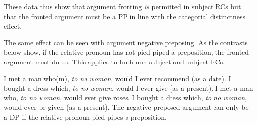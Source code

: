 \documentclass[output=paper]{langsci/langscibook}
\begin{document}
\ea\label{ex:2.47}
    \z
\ex\label{ex:2.48}
    \z
\z
These data thus show that argument fronting \emph{is} permitted in subject RCs
but that the fronted argument must be a PP in line with the categorial
distinctness effect.

The same effect can be seen with argument negative preposing. As the contrasts
below show, if the relative pronoun has not pied-piped a preposition, the
fronted argument must do so. This applies to both non-subject and subject \glspl{RC}.

\ea\label{ex:2.49}
    \ea     I met a man who(m), \textit{to no woman}, would I ever recommend (as a date).
    \ex     I bought a dress which, \textit{to no woman}, would I ever give (as a present).
    \ex     I met a man who, \textit{to no woman}, would ever give roses.
    \ex     I bought a dress which, \textit{to no woman}, would ever be given (as a present).
    \z
\ex\label{ex:2.50}
    \z
\z
The negative preposed argument can only be a DP if the relative pronoun
pied-pipes a preposition.
\end{document}
